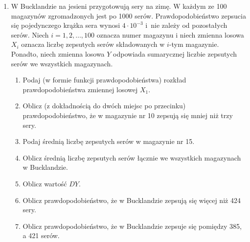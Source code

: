 \documentclass[twoside]{mwart}
\newcommand{\ans}[1]{}
\newcommand{\ans}[1]{\par\emph{Odpowiedź:} #1}
\begin{document}
\begin{enumerate}
	\item W Bucklandzie na jesieni przygotowują sery na zimę. W każdym ze 100 magazynów
	zgromadzonych jest po 1000 serów. Prawdopodobieństwo zepsucia się pojedynczego
	krążka sera wynosi $4\cdot 10^{-3}$ i~nie zależy od pozostałych serów. Niech
	$i=1,2,\ldots,100$ oznacza numer magazynu i niech zmienna losowa $X_i$ oznacza
	liczbę zepsutych serów składowanych w $i$-tym magazynie. Ponadto, niech zmienna
	losowa $Y$ odpowiada sumarycznej liczbie zepsutych serów
	we wszystkich magazynach.
	
	\begin{enumerate}
		\item Podaj  (w formie funkcji prawdopodobieństwa) rozkład prawdopodobieństwa zmiennej losowej $X_1$.
		\item Oblicz (z dokładnością do dwóch miejsc po przecinku) prawdopodobieństwo, że w magazynie nr 10 zepsują się mniej niż trzy sery.
		\item Podaj średnią liczbę zepsutych serów w magazynie nr 15.
		\item Oblicz średnią liczbę zepsutych serów łącznie we wszystkich magazynach w Bucklandzie.
		\item Oblicz wartość $DY$.
		\item Oblicz prawdopodobieństwo, że w Bucklandzie zepsują się więcej niż 424 sery.
		\item Oblicz prawdopodobieństwo, że w Bucklandzie zepsuje się pomiędzy 385, a 421 serów.
	\end{enumerate}

	\ans{
		\begin{enumerate}
			\item \[ P(X_1=k) = {1000 \choose k} (4\cdot 10^{-3})^k(1-4\cdot 10^{-3})^{1000-k} \]
			\item Przybliżenie rozkładem Poissona $\lambda=1000\cdot4\cdot 10^{-3}=4$
			\[ P(X_{10}<3) = P(X_{10}\in\{0,1,2\}) = 0{,}0183+0{,}0733+0{,}1465=0{,}2381 \]
			\item $EX_{15}=1000\cdot4\cdot 10^{-3}=4$
			\item $Y$ jest sumą 100 zmiennych o rozkładzie $B(1000, 4\cdot 10^{-3})$, zatem samo ma rozkład dwumianowy: \mbox{$B(100\cdot 1000, 4\cdot 10^{-3})$}
			\[ EY=100000\cdot4=400 \]
			\item \[ DY = \sqrt{100000\cdot 4\cdot 10^{-3} \cdot (1-4\cdot 10^{-3})} \approx 20  \]
			\item Korzystamy z twierdzenia Moivre'a-Laplace'a i przybliżamy $Y$ rozkładem normalnym $N(400, 20^2 )$. $\Phi$ oznacza dystrybuantę $N(0,1)$
			\[ P(Y>424) = 1-F_{Y}(424) = \text{standaryzacja} = 1-\Phi(\frac{424-400}{20}) = 1-\Phi(1{,}2) = 1-0{,}885=0{,}115  \]
			\item Analogicznie; Z oznacza zmienną z $N(0,1)$
			\begin{align*}
			P(385\leq Y\leq 421) = P(\frac{385-400}{20} \leq Z \leq \frac{421-400}{20} ) = P(-0{,}75 \leq Z \leq 1{,}05) = \\ \Phi(1{,}05) - (1-\Phi(0{,}75)) = \Phi(1{,}05) + \Phi(0{,}75) - 1 = 0{,}8513 + 0{,}7734 - 1 = 0{,}625
			\end{align*}
		\end{enumerate}
	}


\end{enumerate}
\end{document}
